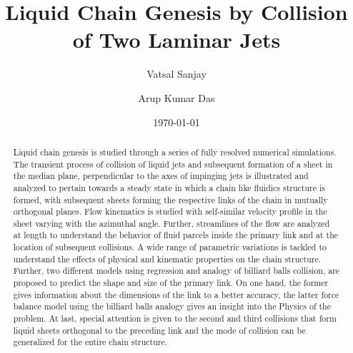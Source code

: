\documentclass[%
aip,
sd,%
amsmath,amssymb,
preprint,%
author-year,%
]{revtex4-1}
\begin{document}
\newcommand{\MarkerCircleRed}{\raisebox{0.5pt}{\tikz{\node[draw,scale=0.4,circle,fill=red!100!red](){};}}}
\newcommand{\MarkerSquareRed}{\raisebox{0.5pt}{\tikz{\node[draw,scale=0.4,regular polygon, regular polygon sides=4,fill=black!20!red](){};}}}
\newcommand{\MarkerDiamondBlack}{\raisebox{0pt}{\tikz{\node[draw,scale=0.4,diamond,fill=black!100!](){};}}}


\title{Liquid Chain Genesis by Collision of Two Laminar Jets}
\author{Vatsal Sanjay}
\author{Arup Kumar Das}
\date{\today}

\begin{abstract}
Liquid chain genesis is studied through a series of fully resolved numerical simulations. The transient process of collision of liquid jets and subsequent formation of a sheet in the median plane, perpendicular to the axes of impinging jets is illustrated and analyzed to pertain towards a steady state in which a chain like fluidics structure is formed, with subsequent sheets forming the respective links of the chain in mutually orthogonal planes. Flow kinematics is studied with self-similar velocity profile in the sheet varying with the azimuthal angle. Further, streamlines of the flow are analyzed at length to understand the behavior of fluid parcels inside the primary link and at the location of subsequent collisions. A wide range of parametric variations is tackled to understand the effects of physical and kinematic properties on the chain structure. Further, two different models using regression and analogy of billiard balls collision, are proposed to predict the shape and size of the primary link. On one hand, the former gives information about the dimensions of the link to a better accuracy, the latter force balance model using the billiard balls analogy gives an insight into the Physics of the problem. At last, special attention is given to the second and third collisions that form liquid sheets orthogonal to the preceding link and the mode of collision can be generalized for the entire chain structure.     
\end{abstract}
\maketitle
\end{document}
